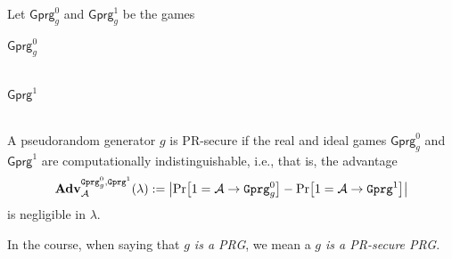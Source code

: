 \begin{security}[PRG]
    Let $\textsf{Gprg}_g^0$ and $\textsf{Gprg}_g^1$ be the games
    \begin{codebox}
    \begin{center}
        \begin{pchstack}
            \pchspace
              \begin{pcvstack}
                \underline{\underline{$\textsf{Gprg}_g^0$}}\\
                \\
										\pcvspace
										\pcvspace
        \end{pcvstack}
                \pchspace
                \begin{pcvstack}
                    \underline{\underline{$\textsf{Gprg}^1$}}\\
                \\
										\pcvspace
									\pcvspace
            \end{pcvstack}
        \end{pchstack}
    \end{center}
  \end{codebox}
    A pseudorandom generator $g$ is PR-secure if the real and ideal games $\textsf{Gprg}_g^0$ and $\textsf{Gprg}^1$ are computationally indistinguishable, i.e., that is, the advantage
\[\mathbf{Adv}_{\adv}^{
  \M{Gprg}_g^0,
  \M{Gprg}^1}
	(\lambda):=\abs{\prob{1=\adv\circ \M{Gprg}_g^0}-\prob{1=\adv\circ \M{Gprg}^1}}\]
is negligible in $\lambda$.
\end{security}
\begin{remark}
In the course, when saying that \emph{$g$ is a PRG}, we mean a \emph{$g$ is a PR-secure PRG}.
\end{remark}